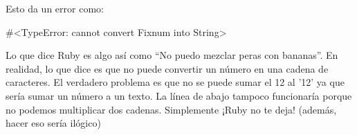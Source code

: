 Esto da un error como:
\begin{console-output}
  #<TypeError: cannot convert Fixnum into String>
\end{console-output}

Lo que dice Ruby es algo así como “No puedo mezclar peras con bananas”. En realidad, lo que dice es que no puede convertir un número en una cadena de caracteres. El verdadero problema es que no se puede sumar el 12 al '12' ya que sería sumar un número a un texto. La línea de abajo tampoco funcionaría porque no podemos multiplicar dos cadenas. Simplemente ¡Ruby no te deja! (además, hacer eso sería ilógico)